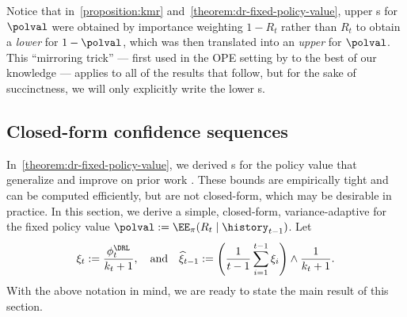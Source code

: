 \begin{remark}\label{remark:mirroring-trick}
Notice that in~\cref{proposition:kmr} and~\cref{theorem:dr-fixed-policy-value}, upper \cs{}s for $\polval$ were obtained by importance weighting $1-R_t$ rather than $R_t$ to obtain a \emph{lower} \cs{} for $1-\polval$, which was then translated into an \emph{upper} \cs{} for $\polval$. This ``mirroring trick'' --- first used in the OPE setting by \citet{thomas2015high} to the best of our knowledge --- applies to all of the results that follow, but for the sake of succinctness, we will only explicitly write the lower \cs{}s.
\end{remark}


\subsection{Closed-form confidence sequences}\label{section:prpl-cs}

In~\cref{theorem:dr-fixed-policy-value}, we derived \cs{}s for the policy value that generalize and improve on prior work \citep{karampatziakis2021off}. These bounds are empirically tight and can be computed efficiently, but are not closed-form, which may be desirable in practice. In this section, we derive a simple, closed-form, variance-adaptive \cs{} for the fixed policy value $\polval := \EE_{\pi}(R_t \mid \history_{t-1})$. Let
\begin{equation}
    \xi_t := \frac{\phi_t^\DRL}{k_t + 1},~~~ \text{and}~~~ \widehat \xi_{t-1} := \left ( \frac{1}{t-1} \sum_{i=1}^{t-1} \xi_i \right ) \land \frac{1}{k_t + 1}.
\end{equation}
With the above notation in mind, we are ready to state the main result of this section.


